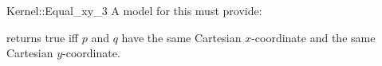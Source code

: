 \begin{ccRefFunctionObjectConcept}{Kernel::Equal_xy_3}
A model for this must provide:


{returns true iff $p$ and $q$ have the same Cartesian $x$-coordinate
and the same Cartesian $y$-coordinate.}

\end{ccRefFunctionObjectConcept}
